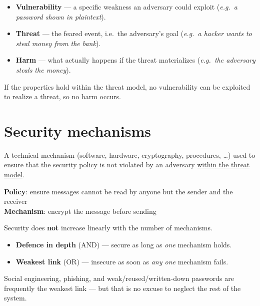 \begin{rembox}[title=Key vocabulary]
\begin{itemize}
  \item \textbf{Vulnerability} — a specific weakness an adversary could exploit (\textit{e.g.\ a password shown in plaintext}).
  \item \textbf{Threat} — the feared event, i.e.\ the adversary's goal (\textit{e.g.\ a hacker wants to steal money from the bank}).
  \item \textbf{Harm} — what actually happens if the threat materializes (\textit{e.g.\ the adversary steals the money}).
\end{itemize}
If the properties hold within the threat model, no vulnerability can be exploited to
realize a threat, so no harm occurs.
\end{rembox}

\section{Security mechanisms}

\begin{defnbox}[title=Security mechanism]
A technical mechanism (software, hardware, cryptography, procedures, \ldots) used to
ensure that the security policy is not violated by an adversary
\underline{within the threat model}.
\end{defnbox}

\begin{exbox}[title=Example]
\textbf{Policy}: ensure messages cannot be read by anyone but the sender and the receiver \\
\textbf{Mechanism}: encrypt the message before sending
\end{exbox}

\begin{propbox}[title=Composing mechanisms]
Security does \textbf{not} increase linearly with the number of mechanisms.
\begin{itemize}
  \item \textbf{Defence in depth} (AND) — secure as long as \emph{one} mechanism holds.
  \item \textbf{Weakest link} (OR) — insecure as soon as \emph{any one} mechanism fails.
\end{itemize}
\end{propbox}

\begin{warnbox}[title=Humans are part of the system]
Social engineering, phishing, and weak/reused/written-down passwords are frequently the
weakest link — but that is no excuse to neglect the rest of the system.
\end{warnbox}

